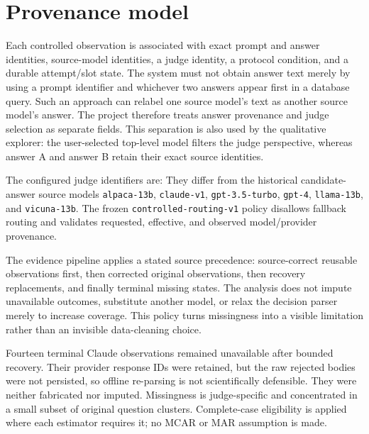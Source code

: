 \section{Provenance model}

Each controlled observation is associated with exact prompt and answer identities, source-model identities, a judge identity, a protocol condition, and a durable attempt/slot state. The system must not obtain answer text merely by using a prompt identifier and whichever two answers appear first in a database query. Such an approach can relabel one source model's text as another source model's answer. The project therefore treats answer provenance and judge selection as separate fields. This separation is also used by the qualitative explorer: the user-selected top-level model filters the judge perspective, whereas answer A and answer B retain their exact source identities.

The configured judge identifiers are:
They differ from the historical candidate-answer source models \texttt{alpaca-13b}, \texttt{claude-v1}, \texttt{gpt-3.5-turbo}, \texttt{gpt-4}, \texttt{llama-13b}, and \texttt{vicuna-13b}. The frozen \texttt{controlled-routing-v1} policy disallows fallback routing and validates requested, effective, and observed model/provider provenance.

The evidence pipeline applies a stated source precedence: source-correct reusable observations first, then corrected original observations, then recovery replacements, and finally terminal missing states. The analysis does not impute unavailable outcomes, substitute another model, or relax the decision parser merely to increase coverage. This policy turns missingness into a visible limitation rather than an invisible data-cleaning choice.

Fourteen terminal Claude observations remained unavailable after bounded recovery. Their provider response IDs were retained, but the raw rejected bodies were not persisted, so offline re-parsing is not scientifically defensible. They were neither fabricated nor imputed. Missingness is judge-specific and concentrated in a small subset of original question clusters. Complete-case eligibility is applied where each estimator requires it; no MCAR or MAR assumption is made.

